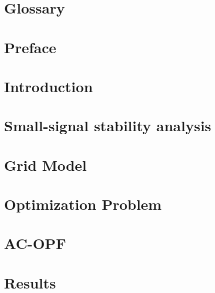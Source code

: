 \documentclass[a4paper, 11pt, titlepage, twoside]{article}
\begin{document}
\cleardoublepage

\tableofcontents

\newpage
\listoffigures

\newpage
\begingroup
\setlength{\parskip}{0pt}
\listoftables %
\endgroup

\setlength{\abovedisplayskip}{5pt} %
\setlength{\belowdisplayskip}{5pt} %

\section*{Glossary}

\newpage

\section*{Preface}

\newpage

\section{Introduction}\label{Introduction}

\newpage

\section{Small-signal stability analysis}\label{Chap2}

\newpage

\section{Grid Model}\label{Chap3}

\newpage

\section{Optimization Problem}\label{Chap4}

\newpage

\section{AC-OPF}\label{Chap5}

\newpage

\section{Results}\label{Chap6}

\newpage
\end{document}
